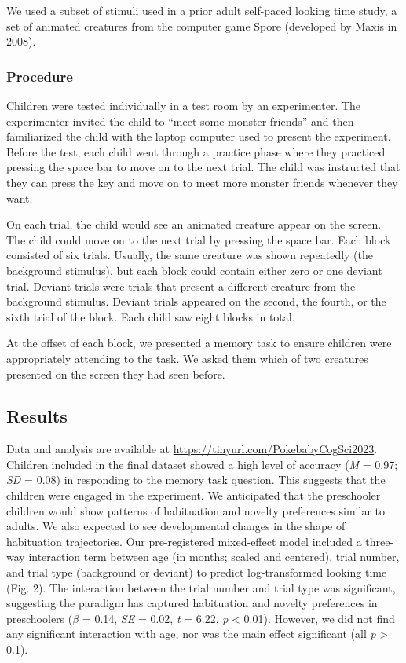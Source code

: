 \documentclass[10pt, letterpaper]{article}
\begin{document}
We used a subset of stimuli used in a prior adult self-paced looking
time study, a set of animated creatures from the computer game Spore
(developed by Maxis in 2008).

\hypertarget{procedure}{%
\subsubsection{Procedure}\label{procedure}}

Children were tested individually in a test room by an experimenter. The
experimenter invited the child to ``meet some monster friends'' and then
familiarized the child with the laptop computer used to present the
experiment. Before the test, each child went through a practice phase
where they practiced pressing the space bar to move on to the next
trial. The child was instructed that they can press the key and move on
to meet more monster friends whenever they want.

On each trial, the child would see an animated creature appear on the
screen. The child could move on to the next trial by pressing the space
bar. Each block consisted of six trials. Usually, the same creature was
shown repeatedly (the background stimulus), but each block could contain
either zero or one deviant trial. Deviant trials were trials that
present a different creature from the background stimulus. Deviant
trials appeared on the second, the fourth, or the sixth trial of the
block. Each child saw eight blocks in total.

At the offset of each block, we presented a memory task to ensure
children were appropriately attending to the task. We asked them which
of two creatures presented on the screen they had seen before.

\hypertarget{results}{%
\subsection{Results}\label{results}}

Data and analysis are available at
\url{https://tinyurl.com/PokebabyCogSci2023}. Children included in the
final dataset showed a high level of accuracy (\emph{M} = 0.97;
\emph{SD} = 0.08) in responding to the memory task question. This
suggests that the children were engaged in the experiment. We
anticipated that the preschooler children would show patterns of
habituation and novelty preferences similar to adults. We also expected
to see developmental changes in the shape of habituation trajectories.
Our pre-registered mixed-effect model included a three-way interaction
term between age (in months; scaled and centered), trial number, and
trial type (background or deviant) to predict log-transformed looking
time (Fig. 2). The interaction between the trial number and trial type
was significant, suggesting the paradigm has captured habituation and
novelty preferences in preschoolers (\(\beta\) = 0.14, \emph{SE} = 0.02,
\emph{t} = 6.22, \emph{p} \textless{} 0.01). However, we did not find
any significant interaction with age, nor was the main effect
significant (all \emph{p} \textgreater{} 0.1).
\end{document}
